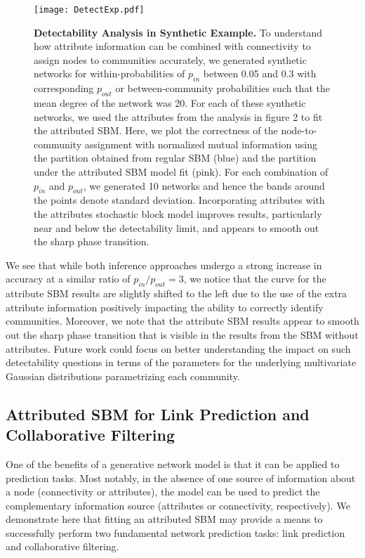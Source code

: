 \begin{figure}[h!]
\begin{center}
\texttt{[image: DetectExp.pdf]}
\caption{{\bf Detectability Analysis in Synthetic Example.} To understand how attribute information can be combined with connectivity to assign nodes to communities accurately, we generated synthetic networks for within-probabilities of $p_{in}$ between 0.05 and 0.3 with corresponding $p_{out}$ or between-community probabilities such that the mean degree of the network was 20. For each of these synthetic networks, we used the attributes from the analysis in figure 2 to fit the attributed SBM. Here, we plot the correctness of the node-to-community assignment with normalized mutual information using the partition obtained from regular SBM (blue) and the partition under the attributed SBM model fit (pink). For each combination of $p_{in}$ and $p_{out}$, we generated 10 networks and hence the bands around the points denote standard deviation. Incorporating attributes with the attributes stochastic block model improves results, particularly near and below the detectability limit, and appears to smooth out the sharp phase transition. }
\label{AttFig3}
\end{center}
\end{figure}

We see that while both inference approaches undergo a strong increase in accuracy at a similar ratio of $p_{in}/p_{out}=3$, we notice that the curve for the attribute SBM results are slightly shifted to the left due to the use of the extra attribute information positively impacting the ability to correctly identify communities. Moreover, we note that the attribute SBM results appear to smooth out the sharp phase transition that is visible in the results from the SBM without attributes. Future work could focus on better understanding the impact on such detectability questions in terms of the parameters for the underlying multivariate Gaussian distributions parametrizing each community. %


\subsection{Attributed SBM for Link Prediction and Collaborative Filtering}
One of the benefits of a generative network model is that it can be applied to prediction tasks. Most notably, in the absence of one source of information about a node (connectivity or attributes), the model can be used to predict the complementary information source (attributes or connectivity, respectively). We demonstrate here that fitting an attributed SBM may provide a means to successfully perform two fundamental network prediction tasks: link prediction and collaborative filtering. 

